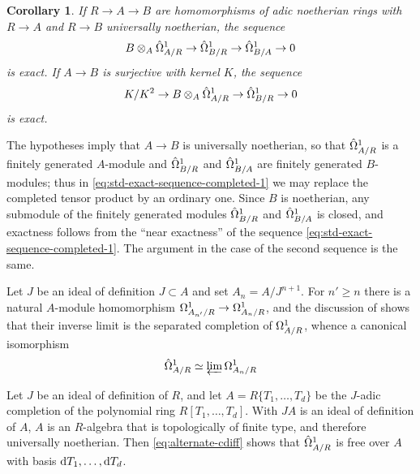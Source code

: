 \documentclass{article}
\theoremstyle{change}
\newtheorem{cor}[subsubsection]{Corollary}
\numberwithin{equation}{subsubsection}
\newcommand{\demobox}{\vrule height6pt width6pt depth0pt}
\newenvironment{demo}{\noindent{\it Proof.}}
{{\unskip\nobreak\hfil\qquad
\demobox\parfillskip=0pt\par}
\medskip}
\newenvironment{example}{\medskip\noindent{\textit{Example.}}}{\medskip}
\begin{document}
\begin{cor}\label{cor:standard-exact-sequences}
  If $R\to A\to B$ are homomorphisms of adic noetherian rings with
  $R\to A$ and $R\to B$ universally noetherian, the sequence
  \begin{displaymath}
    B\otimes_A\hat\Omega^1_{A/R}\to\hat\Omega^1_{B/R}\to\hat\Omega^1_{B/A}\to0
  \end{displaymath}
  is exact. If $A\to B$ is surjective with kernel $K$, the sequence
  \begin{displaymath}
    K/K^2\to B\otimes_A\hat\Omega^1_{A/R}\to\hat\Omega^1_{B/R}\to 0
  \end{displaymath}
  is exact.
\end{cor}
\begin{demo}
  The hypotheses imply that $A\to B$ is universally noetherian, so
  that $\hat\Omega^1_{A/R}$ is a finitely generated $A$-module and
  $\hat\Omega^1_{B/R}$ and $\hat\Omega^1_{B/A}$ are finitely generated
  $B$-modules; thus in \ref{eq:std-exact-sequence-completed-1} we may
  replace the completed tensor product by an ordinary one.  Since $B$
  is noetherian, any submodule of the finitely generated modules
  $\hat\Omega^1_{B/R}$ and $\hat\Omega^1_{B/A}$ is closed, and exactness follows
  from the ``near exactness'' of the sequence
  \ref{eq:std-exact-sequence-completed-1}. The argument in the case of
  the second sequence is the same.
\end{demo}

Let $J$ be an ideal of definition $J\subset A$ and set
$A_n=A/J^{n+1}$. For $n'\ge n$ there is a natural $A$-module
homomorphism $\Omega^1_{A_{n'}/R}\to\Omega^1_{A_n/R}$, and the discussion of 
\cite[$O_{IV}$ 20.7.14]{EGA} shows that their inverse limit is the
separated completion of $\Omega^1_{A/R}$, whence a canonical isomorphism 
\begin{equation}
  \label{eq:alternate-cdiff}
  \hat\Omega^1_{A/R}\simeq\varprojlim\Omega^1_{A_n/R}
\end{equation}

\begin{example}
  Let $J$ be an ideal of definition of $R$, and let
  $A=R\{T_1,\ldots,T_d\}$ be the $J$-adic completion of the polynomial
  ring $R[T_1,\ldots,T_d]$. With $JA$ is an ideal of definition of
  $A$, $A$ is an $R$-algebra that is topologically of finite type, and
  therefore universally noetherian. Then \ref{eq:alternate-cdiff}
  shows that $\hat\Omega^1_{A/R}$ is free over $A$ with basis
  $\mathrm{d} T_1,\ldots,\mathrm{d} T_d$.
\end{example}
\end{document}
